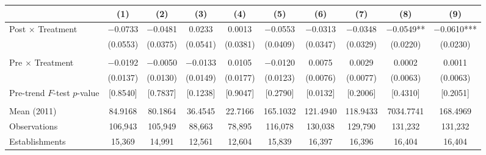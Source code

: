 \documentclass[12pt,letterpaper]{article}
\begin{document}
\begin{table}[]
\begin{threeparttable}
\begin{tabular}{lccccccccc}
 & (1) & (2) & (3) & (4) & (5) & (6) & (7) & (8) & (9) \\
\midrule
Post $\times$ Treatment & $-$0.0733 & $-$0.0481 & 0.0233 & 0.0013 & $-$0.0553 & $-$0.0313 & $-$0.0348 & $-$0.0549** & $-$0.0610*** \\
  & (0.0553) & (0.0375) & (0.0541) & (0.0381) & (0.0409) & (0.0347) & (0.0329) & (0.0220) & (0.0230) \\
  &  &  &  &  &  &  &  &  & \\
Pre $\times$ Treatment & $-$0.0192 & $-$0.0050 & $-$0.0133 & 0.0105 & $-$0.0120 & 0.0075 & 0.0029 & 0.0002 & 0.0011 \\
  & (0.0137) & (0.0130) & (0.0149) & (0.0177) & (0.0123) & (0.0076) & (0.0077) & (0.0063) & (0.0063) \\
Pre-trend $F$-test $p$-value & [0.8540] & [0.7837] & [0.1238] & [0.9047] & [0.2790] & [0.0132] & [0.2006] & [0.4310] & [0.2051] \\
  &  &  &  &  &  &  &  &  & \\
Mean (2011) & 84.9168 & 80.1864 & 36.4545 & 22.7166 & 165.1032 & 121.4940 & 118.9433 & 7034.7741 & 168.4969 \\
Observations & 106{,}943 & 105{,}949 & 88{,}663 & 78{,}895 & 116{,}078 & 130{,}038 & 129{,}790 & 131{,}232 & 131{,}232 \\
Establishments & 15{,}369 & 14{,}991 & 12{,}561 & 12{,}604 & 15{,}839 & 16{,}397 & 16{,}396 & 16{,}404 & 16{,}404 \\
\bottomrule
\end{tabular}
\scriptsize
\begin{tablenotes}

\end{tablenotes}
\end{threeparttable}
\end{table}
\end{document}
